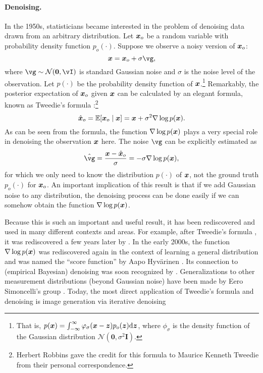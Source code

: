 \documentclass[../../book-main.tex]{subfiles}
\begin{document}
\paragraph{Denoising.} In the 1950s, statisticians became interested in the problem of denoising data drawn from an arbitrary distribution. Let $\bm{x}_o$ be a random variable with probability density function $p_o(\cdot)$. Suppose we observe a noisy version of $\bm{x}_o$:
\begin{equation}
    \x = \x_o + \sigma \vg, 
\end{equation}
where $\vg \sim \dNorm(\vzero, \vI)$ is standard Gaussian noise and $\sigma$ is the noise level of the observation. Let $p(\cdot)$ be the probability density function of $\bm{x}$.\footnote{That is, $p(\bm{x}) = \int_{-\infty}^{\infty} \varphi_{\sigma}(\bm{x} - \bm{z})p_o(\bm{z}) \mathrm{d}\bm{z}$, where $\phi_{\sigma}$ is the density function of the Gaussian distribution $\mathcal{N}(\boldsymbol{0}, \sigma^2 \boldsymbol{I})$.} Remarkably, the posterior expectation of $\bm{x}_o$ given $\bm{x}$ can be calculated by an elegant formula, known as Tweedie's formula \cite{Robbins1956AnEB}:\footnote{Herbert Robbins gave the credit for this formula to Maurice Kenneth Tweedie from their personal correspondence.}
\begin{equation}
    \hat {\bm{x}}_o = \mathbb{E}[\bm{x}_o\mid \bm{x}] = \bm{x} + \sigma^2 \nabla \log p(\bm{x}).
\end{equation}
As can be seen from the formula, the function $\nabla \log p(\bm{x})$ plays a very special role in denoising the observation $\bm{x}$ here. The noise $\vg$ can be explicitly estimated as
\begin{equation}
    \hat{\vg} = \frac{\x - \hat \x_o}{\sigma} = -\sigma \nabla \log p(\x),
\end{equation}
for which we only need to know the distribution $p(\cdot)$ of $\bm{x}$, not the ground truth $p_o(\cdot)$ for $\bm{x}_o$. An important implication of this result is that if we add Gaussian noise to any distribution, the denoising process can be done easily if we can somehow obtain the function $\nabla \log p(\bm{x})$.

Because this is such an important and useful result, it has been rediscovered and used in many different contexts and areas. For example, after Tweedie's formula \cite{Robbins1956AnEB}, it was rediscovered a few years later by \cite{Miyasawa61}. In the early 2000s, the function $\nabla \log p(\bm{x})$ was rediscovered again in the context of learning a general distribution and was named the ``score function'' by Aapo Hyv\"{a}rinen \cite{hyvarinen05a}. Its connection to (empirical Bayesian) denoising was soon recognized by \cite{Vincent2011}.
Generalizations to other measurement distributions (beyond Gaussian noise) have been made by Eero Simoncelli's group \cite{Raphan10}. Today, the most direct application of Tweedie's formula and denoising is image generation via iterative denoising \cite{Kadkhodaie21a,ho2020denoising}
\end{document}
